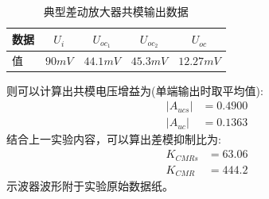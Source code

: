 \documentclass[a4paper,11pt,UTF8]{ctexart}
\begin{document}
	\begin{table}[!h!tbp]
		\caption{典型差动放大器共模输出数据}\label{tab:ncTab}
		\centering
		\begin{tabular}{|l|c|c|c|c|}
			\hline
			数据 &$U_{i}$&$U_{oc_1}$&$U_{oc_2}$&$U_{oc}$         \\ \hline
			值   &$90mV$&$44.1mV$&$45.3mV$&$12.27mV$     \\ \hline
		\end{tabular}
	\end{table}
	则可以计算出共模电压增益为(单端输出时取平均值):
	\begin{equation}
		\begin{aligned}
			\left | A_{ucs}\right |&=0.4900\\
			\left | A_{uc}\right |&=0.1363
		\end{aligned}
	\end{equation}
	结合上一实验内容，可以算出差模抑制比为:
	\begin{equation}
		\begin{aligned}
			K_{CMRs}&=63.06\\
			K_{CMR}&=444.2
		\end{aligned}
	\end{equation}
	示波器波形附于实验原始数据纸。
\end{document}
